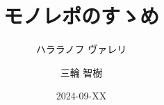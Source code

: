 \documentclass{beamer}
\title{モノレポのすゝめ}
\author{ハララノフ ヴァレリ \and 三輪 智樹}
\institute{無所属}
\date{2024-09-XX} %
\begin{document}
\frame{\titlepage}








\end{document}
